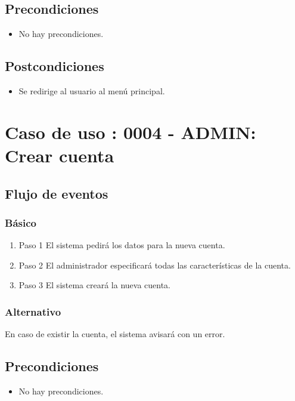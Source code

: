 \subsection{Precondiciones}
\begin{itemize}
\item No hay precondiciones.
\end{itemize}
\subsection{Postcondiciones}
\begin{itemize}
\item Se redirige al usuario al menú principal.
\end{itemize}

\section{Caso de uso : 0004 - ADMIN: Crear cuenta}\label{sec:uc0}



\subsection{Flujo de eventos}

\subsubsection{Básico}

\begin{enumerate}
\item Paso 1
El sistema pedirá los datos para la nueva cuenta.
\item Paso 2
El administrador especificará todas las características de la cuenta.
\item Paso 3
El sistema creará la nueva cuenta.
\end{enumerate}

  \subsubsection{Alternativo}
En caso de existir la cuenta, el sistema avisará con un error.
\subsection{Precondiciones}
\begin{itemize}
\item No hay precondiciones.
\end{itemize}
